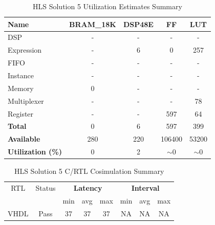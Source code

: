 \begin{table}[H]
	\centering
	\begin{tabular}{|l|c|c|c|c|}
		\hline
		\textbf{Name}    & \textbf{BRAM\_18K} & \textbf{DSP48E} & \textbf{FF} & \textbf{LUT} \\ \hline
		DSP              & -                   & -               & -           & -            \\ 
		Expression       & -                   & 6              & 0           & 257          \\ 
		FIFO             & -                   & -               & -           & -            \\ 
		Instance         & -                   & -               & -           & -            \\ 
		Memory           & 0                   & -               & -          & -            \\ 
		Multiplexer      & -                   & -               & -           & 78          \\ 
		Register         & -                   & -               & 597         & 64            \\ \hline
		\textbf{Total}   & 0                   & 6               & 597         & 399          \\ \hline
		\textbf{Available} & 280               & 220             & 106400      & 53200        \\ \hline
		\textbf{Utilization (\%)} & 0            & 2               & $\sim$0     & $\sim$0      \\ \hline
	\end{tabular}
	\caption{HLS Solution 5 Utilization Estimates Summary}
	\label{tab:hls-solution-5-utilization-estimates-summary}
\end{table}

\begin{table}[H]
	\centering
	\begin{tabular}{|c|c|c|c|c|c|c|c|}
		\hline
		\multicolumn{1}{|c|}{RTL} & \multicolumn{1}{|c|}{Status} & \multicolumn{3}{c|}{\textbf{Latency}} & \multicolumn{3}{c|}{\textbf{Interval}} \\
		&  & min & avg & max & min & avg & max \\
		\hline
		VHDL & Pass & 37 & 37 & 37 & NA & NA & NA \\
		\hline
	\end{tabular}
	\caption{HLS Solution 5 C/RTL Cosimulation Summary }
	\label{tab:hls-solution-5-cosimulation-summary}
\end{table}

